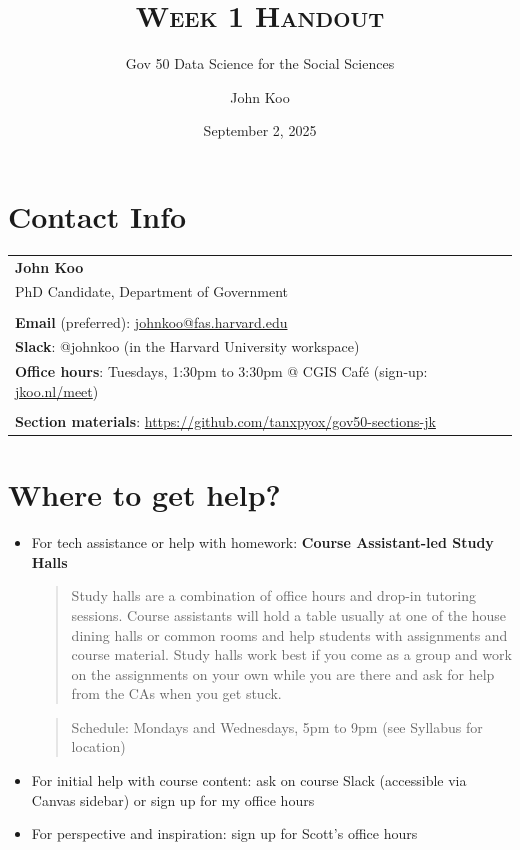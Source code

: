 \documentclass[
  11pt,
  letterpaper]{article}
\title{\textsc{Week 1 Handout}}
\subtitle{Gov 50 Data Science for the Social Sciences}
\author{John Koo}
\date{September 2, 2025}
\begin{document}
\maketitle

\section{Contact Info}\label{contact-info}

\begin{table}[!h]

\centering

\begin{tabular}{l}
  \textbf{John Koo} \\
  PhD Candidate, Department of Government \\ \\
  
  \textbf{Email} (preferred): \href{mailto:johnkoo@fas.harvard.edu}{johnkoo@fas.harvard.edu} \\
  \textbf{Slack}: @johnkoo (in the Harvard University workspace) \\
  \textbf{Office hours}: Tuesdays, 1:30pm to 3:30pm @ CGIS Caf\'e (sign-up: \href{https://jkoo.nl/meet}{jkoo.nl/meet}) \\ \\ 
  \textbf{Section materials}: \url{https://github.com/tanxpyox/gov50-sections-jk}
  
  \end{tabular}
\end{table}

\section{Where to get help?}\label{where-to-get-help}

\begin{itemize}
\item
  For tech assistance or help with homework: \textbf{Course
  Assistant-led Study Halls}

  \begin{quote}
  Study halls are a combination of office hours and drop-in tutoring
  sessions. Course assistants will hold a table usually at one of the
  house dining halls or common rooms and help students with assignments
  and course material. Study halls work best if you come as a group and
  work on the assignments on your own while you are there and ask for
  help from the CAs when you get stuck.
  \end{quote}

  \begin{quote}
  Schedule: Mondays and Wednesdays, 5pm to 9pm (see Syllabus for
  location)
  \end{quote}
\item
  For initial help with course content: ask on course Slack (accessible
  via Canvas sidebar) or sign up for my office hours
\item
  For perspective and inspiration: sign up for Scott's office hours
\end{itemize}
\end{document}
